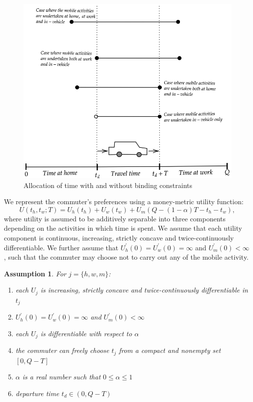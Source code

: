 \documentclass[12pt,a4paper,british]{article}
\newtheorem{assumption}{Assumption}[section]
\begin{document}
 \begin{figure}[ht!]
     \centering
     \includegraphics[width=0.5\textheight]{allocationPossibilities.png}
     \caption{Allocation of time with and without binding constraints}
     \label{fig:time_allocation}
 \end{figure}


%


We represent the commuter's preferences using a money-metric utility function:%
\begin{equation}
U\left(t_{h},t_{w};T\right)=U_{h}\left(t_{h}\right)+U_{w}\left(t_{w}\right)+U_{m}\left(Q-\left(1-\alpha\right)T-t_{h}-t_{w}\right),
\label{utility0}
\end{equation}
where utility is assumed to be additively separable into three components depending on the activities in which time is spent. We assume that each utility component is continuous, increasing, strictly concave and twice-continuously differentiable. We further assume that $U_{h}^{\prime}\left(0\right) = U_{w}^{\prime}\left(0\right) = \infty$ and $U_{m}^{\prime}\left(0\right)<\infty$, such that the commuter may choose not to carry out any of the mobile activity.

\begin{assumption}
    For $j=\{h,w,m\}$:
    \begin{enumerate}
        \item each $U_j$ is increasing, strictly concave and twice-continuously differentiable in $t_j$
        \item $U_{h}^{\prime}\left(0\right) = U_{w}^{\prime}\left(0\right) = \infty$ and $U_{m}^{\prime}\left(0\right)<\infty$
        \item each $U_j$ is differentiable with respect to $\alpha$
        \item the commuter can freely choose $t_j$ from a compact and nonempty set $[0, Q-T]$
        \item $\alpha$ is a real number such that $0 \leq \alpha \leq 1$
        \item departure time $t_d \in (0, Q-T)$
    \end{enumerate}
\end{assumption}
\end{document}
